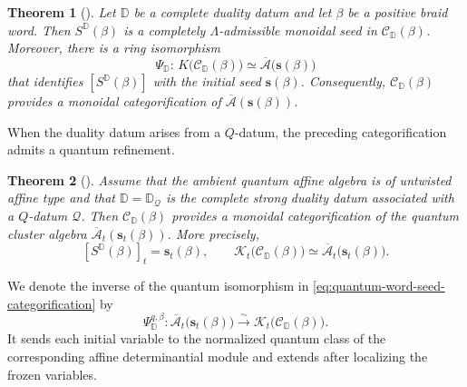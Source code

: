 \documentclass[12pt, reqno]{amsart}
\theoremstyle{plain}
\newtheorem{theorem}{Theorem}[section]
\theoremstyle{definition}
\numberwithin{equation}{section}
\newcommand{\DD}{\mathbb{D}}
\begin{document}
\begin{theorem}[{\cite[Theorem~9.4]{kashiwara2025monoidal}}]
\label{thm:Lambda-admissible-seed}
Let \(\DD\) be a complete duality datum and let \(\beta\) be a
positive braid word. Then \(S^{\DD}(\beta)\) is a completely
\(\Lambda\)-admissible monoidal seed in
\(\mathscr C_{\DD}(\beta)\). Moreover, there is a ring isomorphism
\begin{equation}\label{eq:word-seed-categorification}
   \Psi_\DD:\, K\bigl(\mathscr C_{\DD}(\beta)\bigr)
    \simeq
    \overline{\mathcal A}\bigl(\mathbf s(\beta)\bigr)
\end{equation}
that identifies \([S^{\DD}(\beta)]\) with the initial seed
\(\mathbf s(\beta)\). Consequently, \(\mathscr C_{\DD}(\beta)\)
provides a monoidal categorification of
\(\overline{\mathcal A}(\mathbf s(\beta))\).
\end{theorem}

When the duality datum arises from a \(Q\)-datum, the preceding
categorification admits a quantum refinement.

\begin{theorem}[{\cite[Theorem~9.12]{kashiwara2025monoidal}}]
\label{thm:word-seed-monoidal-categorification}
Assume that the ambient quantum affine algebra is of untwisted affine
type and that \(\DD=\DD_{\mathcal Q}\) is the complete strong duality
datum associated with a \(Q\)-datum \(\mathcal Q\). Then
\(\mathscr C_{\DD}(\beta)\) provides a monoidal categorification of
the quantum cluster algebra
\(\overline{\mathcal A}_t(\mathbf s_t(\beta))\). More precisely,
\begin{equation}\label{eq:quantum-word-seed-categorification}
    [S^{\DD}(\beta)]_t=\mathbf s_t(\beta),
    \qquad
    \mathcal{K}_t\bigl(\mathscr C_{\DD}(\beta)\bigr)
    \simeq
    \overline{\mathcal A}_t\bigl(\mathbf s_t(\beta)\bigr).
\end{equation}
\end{theorem}

We denote the inverse of the quantum isomorphism in
\eqref{eq:quantum-word-seed-categorification} by
\begin{equation}\label{eq:quantum-word-seed-realization}
    \Psi_{\DD}^{q,\beta}\colon
    \overline{\mathcal A}_t\bigl(\mathbf s_t(\beta)\bigr)
    \xrightarrow{\sim}
    \mathcal K_t\bigl(\mathscr C_{\DD}(\beta)\bigr).
\end{equation}
It sends each initial variable to the normalized quantum class of
the corresponding affine determinantial module and extends after
localizing the frozen variables.
\end{document}
